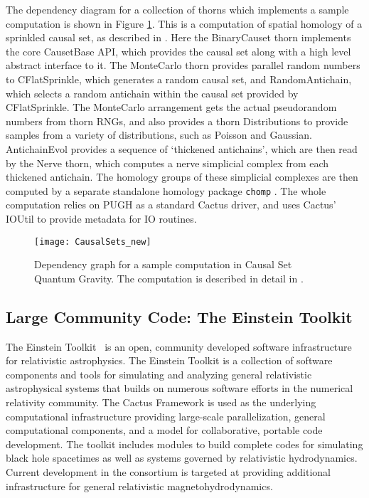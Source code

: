 \documentclass[conference]{IEEEtran}
\begin{document}
The dependency diagram for a collection of thorns which implements a sample
computation is shown in Figure \ref{CausalSetsFull}.  This is a computation
of spatial homology of a sprinkled causal set, as described in \cite{numhomology}.
Here the BinaryCauset
thorn implements the core CausetBase API, which provides the causal set along
with a high level abstract interface to it.  The MonteCarlo thorn provides
parallel random numbers to CFlatSprinkle, which generates a random causal
set, and RandomAntichain, which selects a random antichain within the causal
set provided by CFlatSprinkle.  
The MonteCarlo arrangement gets the actual pseudorandom numbers from thorn
RNGs, and also provides a thorn Distributions to provide samples from a
variety of distributions, such as Poisson and Gaussian.
AntichainEvol provides a sequence of
`thickened antichains', which are then read by the Nerve thorn, which
computes a nerve simplicial complex from each thickened antichain.  The
homology groups of these
simplicial complexes are then computed by a separate standalone homology
package {\tt chomp} \cite{chomp}.
The whole computation relies on PUGH as a standard Cactus driver, and uses
Cactus' IOUtil to provide metadata for IO routines.

\begin{figure}[h]
\centering
\texttt{[image: CausalSets\_new]}
\caption{Dependency graph for a sample computation in Causal Set Quantum
  Gravity.  The computation is described in detail in \cite{numhomology}.}
\label{CausalSetsFull}
\end{figure}




\subsection{Large Community Code: The Einstein Toolkit}
\label{EinsteinToolkit}


The Einstein Toolkit~\cite{einsteintoolkitweb} is an open, community developed software infrastructure for relativistic astrophysics. The Einstein Toolkit is a 
collection of software components and tools for simulating and analyzing general relativistic astrophysical systems that builds on numerous software efforts in the numerical relativity community. 
The Cactus Framework is used as the underlying computational infrastructure providing large-scale parallelization, 
general computational components, and a model for collaborative, portable code development. The toolkit includes modules 
to build complete codes for simulating black hole spacetimes as well as systems governed by relativistic hydrodynamics. 
Current development in the consortium is targeted at providing additional infrastructure for general relativistic magnetohydrodynamics.
\end{document}
